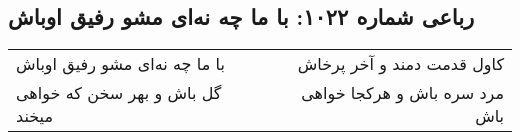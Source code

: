 \begin{center}
\section*{رباعی شماره ۱۰۲۲: با ما چه نه‌ای مشو رفیق اوباش}
\label{sec:1022}
\begin{longtable}{l p{0.5cm} r}
با ما چه نه‌ای مشو رفیق اوباش
&&
کاول قدمت دمند و آخر پرخاش
\\
گل باش و بهر سخن که خواهی میخند
&&
مرد سره باش و هرکجا خواهی باش
\\
\end{longtable}
\end{center}
